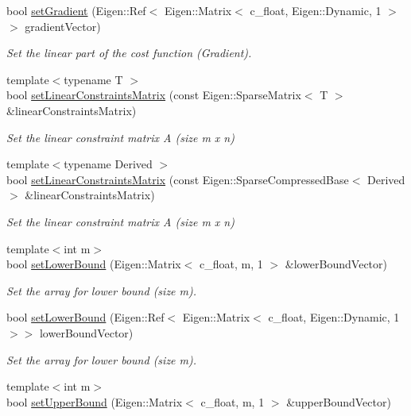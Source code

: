 \begin{DoxyCompactItemize}
bool \mbox{\hyperlink{classOsqpEigen_1_1Data_ab86ee5d803c64024e54c36f6788e0b60}{set\+Gradient}} (Eigen\+::\+Ref$<$ Eigen\+::\+Matrix$<$ c\+\_\+float, Eigen\+::\+Dynamic, 1 $>$$>$ gradient\+Vector)
\begin{DoxyCompactList}\small\item\em Set the linear part of the cost function (Gradient). \end{DoxyCompactList}\item 
{\footnotesize template$<$typename T $>$ }\\bool \mbox{\hyperlink{classOsqpEigen_1_1Data_a202b1b554cad83590bf9999b1ffdf6c5}{set\+Linear\+Constraints\+Matrix}} (const Eigen\+::\+Sparse\+Matrix$<$ T $>$ \&linear\+Constraints\+Matrix)
\begin{DoxyCompactList}\small\item\em Set the linear constraint matrix A (size m x n) \end{DoxyCompactList}\item 
{\footnotesize template$<$typename Derived $>$ }\\bool \mbox{\hyperlink{classOsqpEigen_1_1Data_a417bc1b26a3ed55015f7516e8c393e53}{set\+Linear\+Constraints\+Matrix}} (const Eigen\+::\+Sparse\+Compressed\+Base$<$ Derived $>$ \&linear\+Constraints\+Matrix)
\begin{DoxyCompactList}\small\item\em Set the linear constraint matrix A (size m x n) \end{DoxyCompactList}\item 
{\footnotesize template$<$int m$>$ }\\bool \mbox{\hyperlink{classOsqpEigen_1_1Data_a2309f26732b40ef31a639ab8d0478e18}{set\+Lower\+Bound}} (Eigen\+::\+Matrix$<$ c\+\_\+float, m, 1 $>$ \&lower\+Bound\+Vector)
\begin{DoxyCompactList}\small\item\em Set the array for lower bound (size m). \end{DoxyCompactList}\item 
bool \mbox{\hyperlink{classOsqpEigen_1_1Data_aaa6bdc5a9905c3719d5b198106ed4683}{set\+Lower\+Bound}} (Eigen\+::\+Ref$<$ Eigen\+::\+Matrix$<$ c\+\_\+float, Eigen\+::\+Dynamic, 1 $>$$>$ lower\+Bound\+Vector)
\begin{DoxyCompactList}\small\item\em Set the array for lower bound (size m). \end{DoxyCompactList}\item 
{\footnotesize template$<$int m$>$ }\\bool \mbox{\hyperlink{classOsqpEigen_1_1Data_a0c8a933f59793f4ecb92f6b04917d3ac}{set\+Upper\+Bound}} (Eigen\+::\+Matrix$<$ c\+\_\+float, m, 1 $>$ \&upper\+Bound\+Vector)

\end{DoxyCompactItemize}
